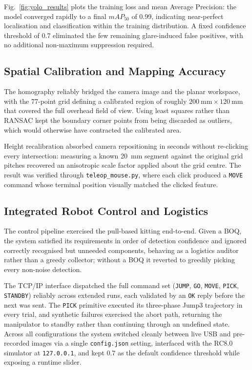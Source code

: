 \documentclass[11pt,conference]{IEEEtran}
\begin{document}
Fig.~\ref{fig:yolo_results} plots the training loss and mean Average Precision: the model converged rapidly to a final $mAP_{50}$ of 0.99, indicating near-perfect localisation and classification within the training distribution. A fixed confidence threshold of 0.7 eliminated the few remaining glare-induced false positives, with no additional non-maximum suppression required.

\subsection{Spatial Calibration and Mapping Accuracy}
The homography reliably bridged the camera image and the planar workspace, with the 77-point grid defining a calibrated region of roughly $200~\text{mm} \times 120~\text{mm}$ that covered the full overhead field of view. Using least squares rather than RANSAC kept the boundary corner points from being discarded as outliers, which would otherwise have contracted the calibrated area.

Height recalibration absorbed camera repositioning in seconds without re-clicking every intersection: measuring a known 20~mm segment against the original grid pitches recovered an anisotropic scale factor applied about the grid centre. The result was verified through \texttt{teleop\_mouse.py}, where each click produced a \texttt{MOVE} command whose terminal position visually matched the clicked feature.

\subsection{Integrated Robot Control and Logistics}
The control pipeline exercised the pull-based kitting end-to-end. Given a BOQ, the system satisfied its requirements in order of detection confidence and ignored correctly recognised but unneeded components, behaving as a logistics auditor rather than a greedy collector; without a BOQ it reverted to greedily picking every non-noise detection.

The TCP/IP interface dispatched the full command set (\texttt{JUMP}, \texttt{GO}, \texttt{MOVE}, \texttt{PICK}, \texttt{STANDBY}) reliably across extended runs, each validated by an \texttt{OK} reply before the next was sent. The \texttt{PICK} primitive executed its three-phase Jump3 trajectory in every trial, and synthetic failures exercised the abort path, returning the manipulator to standby rather than continuing through an undefined state. Across all configurations the system switched cleanly between live USB and pre-recorded images via a single \texttt{config.json} setting, interfaced with the RC8.0 simulator at \texttt{127.0.0.1}, and kept 0.7 as the default confidence threshold while exposing a runtime slider.
\end{document}
